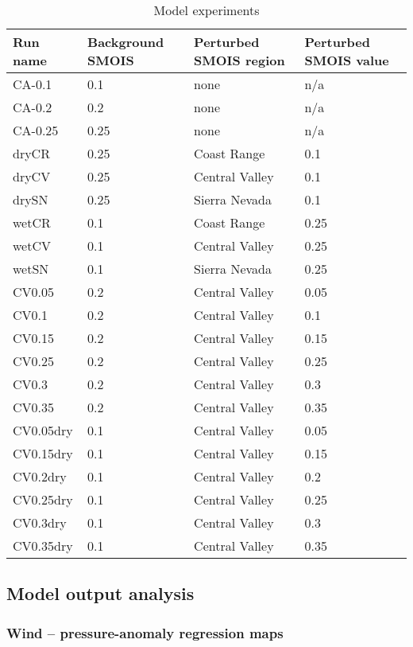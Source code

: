 \begin{table}
\begin{tabular}{l l l l}
\hline
Run name & Background SMOIS & Perturbed SMOIS region & Perturbed SMOIS value \\
\hline
CA-0.1 & 0.1 & none & n/a \\
CA-0.2 & 0.2 & none & n/a \\
CA-0.25 & 0.25 & none & n/a \\
dryCR & 0.25 & Coast Range & 0.1 \\
dryCV & 0.25 & Central Valley & 0.1 \\
drySN & 0.25 & Sierra Nevada & 0.1 \\
wetCR & 0.1 & Coast Range & 0.25 \\
wetCV & 0.1 & Central Valley & 0.25 \\
wetSN & 0.1 & Sierra Nevada & 0.25 \\
CV0.05 & 0.2 & Central Valley & 0.05 \\
CV0.1 & 0.2 & Central Valley & 0.1 \\
CV0.15 & 0.2 & Central Valley & 0.15 \\
CV0.25 & 0.2 & Central Valley & 0.25 \\
CV0.3 & 0.2 & Central Valley & 0.3 \\
CV0.35 & 0.2 & Central Valley & 0.35 \\
CV0.05dry & 0.1 & Central Valley & 0.05 \\
CV0.15dry & 0.1 & Central Valley & 0.15 \\
CV0.2dry & 0.1 & Central Valley & 0.2 \\
CV0.25dry & 0.1 & Central Valley & 0.25 \\
CV0.3dry & 0.1 & Central Valley & 0.3 \\
CV0.35dry & 0.1 & Central Valley & 0.35 \\
\hline
\end{tabular}
\caption{Model experiments}
\label{table:windSol_runlist}
\end{table}

\subsection{Model output analysis}

\subsubsection{Wind -- pressure-anomaly regression maps}


